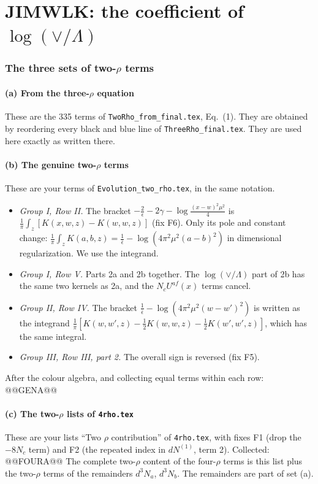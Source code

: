 \documentclass[10pt]{article}
\numberwithin{equation}{section}
\begin{document}
\part{JIMWLK: the coefficient of \texorpdfstring{$\log(\vee/\Lambda)$}{log(vee/Lambda)}}
\section{The three sets of two-\texorpdfstring{$\rho$}{rho} terms}\label{sec:sets}
\subsection{(a) From the three-\texorpdfstring{$\rho$}{rho} equation}
These are the 335 terms of \texttt{TwoRho\_from\_final.tex}, Eq.~(1). They are obtained by reordering every black and blue line of \texttt{ThreeRho\_final.tex}. They are used here exactly as written there.

\subsection{(b) The genuine two-\texorpdfstring{$\rho$}{rho} terms}
These are your terms of \texttt{Evolution\_two\_rho.tex}, in the same notation.
\begin{itemize}
\item \emph{Group I, Row II.} The bracket $-\frac2\epsilon-2\gamma-\log\frac{(x-w)^2\mu^2}{4}$ is $\frac1\pi\int_z[K(x,w,z)-K(w,w,z)]$ (fix F6). Only its pole and constant change: $\frac1\pi\int_zK(a,b,z)=\frac1{\bar\epsilon}-\log(4\pi^2\mu^2(a-b)^2)$ in dimensional regularization. We use the integrand.
\item \emph{Group I, Row V.} Parts 2a and 2b together. The $\log(\vee/\Lambda)$ part of 2b has the same two kernels as 2a, and the $N_cU^{af}(x)$ terms cancel.
\item \emph{Group II, Row IV.} The bracket $\frac1{\bar\epsilon}-\log(4\pi^2\mu^2(w-w')^2)$ is written as the integrand $\frac1\pi[K(w,w',z)-\frac12K(w,w,z)-\frac12K(w',w',z)]$, which has the same integral.
\item \emph{Group III, Row III, part 2.} The overall sign is reversed (fix F5).
\end{itemize}
After the colour algebra, and collecting equal terms within each row:
@@GENA@@

\subsection{(c) The two-\texorpdfstring{$\rho$}{rho} lists of \texttt{4rho.tex}}
These are your lists ``Two $\rho$ contribution'' of \texttt{4rho.tex}, with fixes F1 (drop the $-8N_c$ term) and F2 (the repeated index in $dN^{(1)}$, term 2). Collected:
@@FOURA@@
The complete two-$\rho$ content of the four-$\rho$ terms is this list plus the two-$\rho$ terms of the remainders $d^3N_a$, $d^3N_b$. The remainders are part of set (a).
\end{document}
